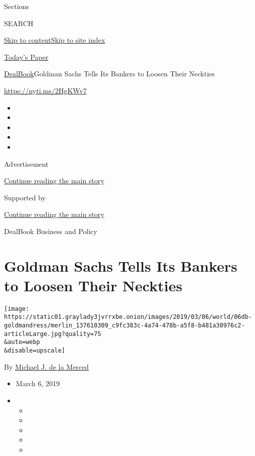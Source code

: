 Sections

SEARCH

\protect\hyperlink{site-content}{Skip to
content}\protect\hyperlink{site-index}{Skip to site index}

\href{https://myaccount.nytimes3xbfgragh.onion/auth/login?response_type=cookie\&client_id=vi}{}

\href{https://www.nytimes3xbfgragh.onion/section/todayspaper}{Today's
Paper}

\href{/section/business/dealbook}{DealBook}\textbar{}Goldman Sachs Tells
Its Bankers to Loosen Their Neckties

\url{https://nyti.ms/2HgKWv7}

\begin{itemize}
\item
\item
\item
\item
\item
\end{itemize}

Advertisement

\protect\hyperlink{after-top}{Continue reading the main story}

Supported by

\protect\hyperlink{after-sponsor}{Continue reading the main story}

DealBook Business and Policy

\hypertarget{goldman-sachs-tells-its-bankers-to-loosen-their-neckties}{%
\section{Goldman Sachs Tells Its Bankers to Loosen Their
Neckties}\label{goldman-sachs-tells-its-bankers-to-loosen-their-neckties}}

\texttt{[image: https://static01.graylady3jvrrxbe.onion/images/2019/03/06/world/06db-goldmandress/merlin\_137610309\_c9fc383c-4a74-478b-a5f8-b481a30976c2-articleLarge.jpg?quality=75\\\&auto=webp\\\&disable=upscale]}

By
\href{https://www.nytimes3xbfgragh.onion/by/michael-j-de-la-merced}{Michael
J. de la Merced}

\begin{itemize}
\item
  March 6, 2019
\item
  \begin{itemize}
  \item
  \item
  \item
  \item
  \item
  \end{itemize}
\end{itemize}

